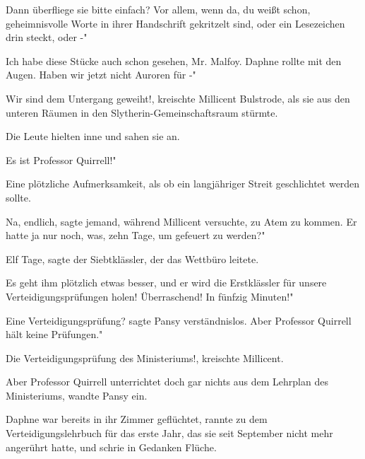 \glqq{}Dann überfliege sie bitte einfach? Vor allem, wenn da, du weißt schon,
geheimnisvolle Worte in ihrer Handschrift gekritzelt sind, oder ein Lesezeichen
drin steckt, oder -"

\glqq{}Ich habe diese Stücke auch schon gesehen, Mr. Malfoy.\grqq{} Daphne rollte
mit den Augen. \glqq{}Haben wir jetzt nicht Auroren für -"

\glqq{}Wir sind dem Untergang geweiht!\grqq{}, kreischte Millicent Bulstrode, als
sie aus den unteren Räumen in den Slytherin-Gemeinschaftsraum stürmte.

Die Leute hielten inne und sahen sie an.

\glqq{}Es ist Professor Quirrell!"

Eine plötzliche Aufmerksamkeit, als ob ein langjähriger Streit geschlichtet
werden sollte.

\glqq{}Na, endlich\grqq{}, sagte jemand, während Millicent versuchte, zu Atem zu
kommen. \glqq{}Er hatte ja nur noch, was, zehn Tage, um gefeuert zu werden?"

\glqq{}Elf Tage\grqq{}, sagte der Siebtklässler, der das Wettbüro leitete.

\glqq{}Es geht ihm plötzlich etwas besser, und er wird die Erstklässler für
unsere Verteidigungsprüfungen holen! Überraschend! In fünfzig Minuten!"

\glqq{}Eine Verteidigungsprüfung?\grqq{} sagte Pansy verständnislos. \glqq{}Aber
Professor Quirrell hält keine Prüfungen."

\glqq{}Die Verteidigungsprüfung des Ministeriums!\grqq{}, kreischte Millicent.

\glqq{}Aber Professor Quirrell unterrichtet doch gar nichts aus dem Lehrplan des
Ministeriums\grqq{}, wandte Pansy ein.

Daphne war bereits in ihr Zimmer geflüchtet, rannte zu dem Verteidigungslehrbuch
für das erste Jahr, das sie seit September nicht mehr angerührt hatte, und
schrie in Gedanken Flüche.

